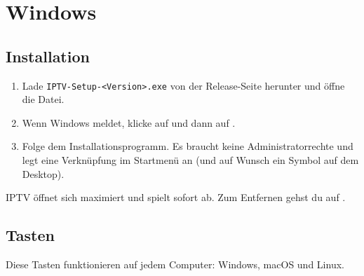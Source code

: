 
\section{Windows}
\label{sec:windows}

\subsection{Installation}
\begin{enumerate}
  \item Lade \texttt{IPTV-Setup-\textless Version\textgreater.exe} von der
        Release-Seite herunter und öffne die Datei.
  \item Wenn Windows 
        meldet, klicke auf  und dann auf
        .
  \item Folge dem Installationsprogramm. Es braucht keine
        Administratorrechte und legt eine Verknüpfung im Startmenü an (und
        auf Wunsch ein Symbol auf dem Desktop).
\end{enumerate}
IPTV öffnet sich maximiert und spielt sofort ab. Zum Entfernen gehst du auf
.

\subsection{Tasten}
\label{sec:keys}
Diese Tasten funktionieren auf jedem Computer: Windows, macOS und Linux.

